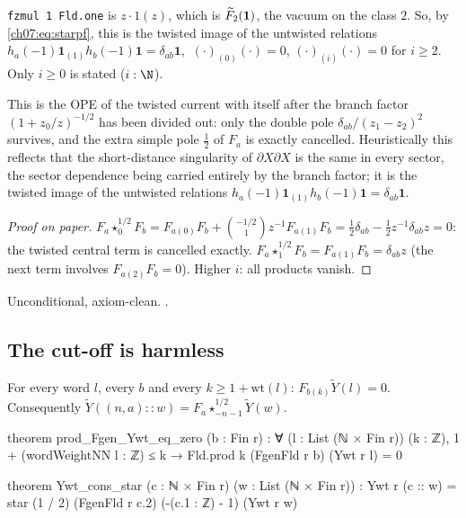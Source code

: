 \begin{dictionary}
\verb|fzmul 1 Fld.one| is $z\cdot1(z)$, which is $\widetilde{F}_2(\mathbf 1)$, the vacuum on the
class $2$. So, by \eqref{ch07:eq:starpf}, this is the twisted image of the untwisted relations
$h_a(-1)\mathbf 1_{(1)}h_b(-1)\mathbf 1 = \delta_{ab}\mathbf 1$, $\ (\cdot)_{(0)}(\cdot) = 0$,
$(\cdot)_{(i)}(\cdot)=0$ for $i\ge2$. Only $i\ge0$ is stated ($i:\N$).
\end{dictionary}

\begin{physics}
This is the OPE of the twisted current with itself after the branch factor $(1+z_0/z)^{-1/2}$ has been divided out: only the double pole $\delta_{ab}/(z_1-z_2)^2$ survives, and the extra simple pole $\tfrac12$ of $F_a$ is exactly cancelled. Heuristically this reflects that the short-distance singularity of $\partial X\partial X$ is the same in every sector, the sector dependence being carried entirely by the branch factor; it is the twisted image of the untwisted relations $h_a(-1)\mathbf 1_{(1)}h_b(-1)\mathbf 1=\delta_{ab}\mathbf 1$.
\end{physics}

\begin{proof}[Proof on paper]
$F_a\star^{1/2}_0F_b = F_{a(0)}F_b + \binom{-1/2}{1}z^{-1}F_{a(1)}F_b = \frac12\delta_{ab} -
\frac12z^{-1}\delta_{ab}z = 0$: the twisted central term is cancelled exactly.
$F_a\star^{1/2}_1F_b = F_{a(1)}F_b = \delta_{ab}z$ (the next term involves $F_{a(2)}F_b = 0$).
Higher $i$: all products vanish.
\end{proof}

\begin{status}
Unconditional, axiom-clean. .
\end{status}

\subsection{The cut-off is harmless}

\begin{proposition}\label{ch07:prop:cutoff}
For every word $l$, every $b$ and every $k\ge1+\mathrm{wt}(l)$: $F_{b(k)}\widetilde Y(l) = 0$.
Consequently $\widetilde Y((n,a)::w) = F_a\star^{1/2}_{-n-1}\widetilde Y(w)$.
\end{proposition}

\begin{leancode}
theorem prod_Fgen_Ywt_eq_zero (b : Fin r) :
    ∀ (l : List (ℕ × Fin r)) (k : ℤ), 1 + (wordWeightNN l : ℤ) ≤ k →
      Fld.prod k (FgenFld r b) (Ywt r l) = 0

theorem Ywt_cons_star (c : ℕ × Fin r) (w : List (ℕ × Fin r)) :
    Ywt r (c :: w) = star (1 / 2) (FgenFld r c.2) (-(c.1 : ℤ) - 1) (Ywt r w)
\end{leancode}

